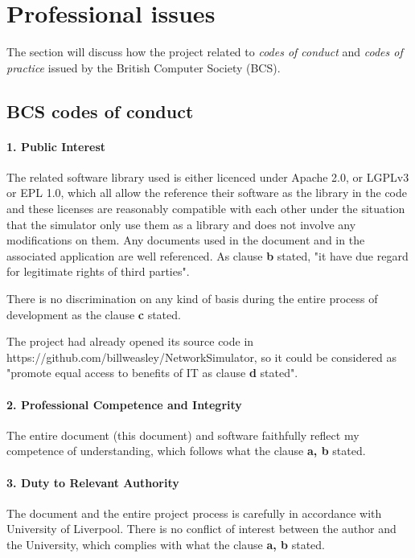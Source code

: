 \section{Professional issues}
The section will discuss how the project related to \textit{codes of conduct} \cite{bcsconduct} and \textit{codes of practice} \cite{bcspractic} issued by the British Computer Society (BCS).

\subsection{BCS codes of conduct \cite{bcsconduct}}
\paragraph{1. Public Interest}
The related software library \cite{Kotlin,Koma,GraphStream,JUnit} used is either licenced under Apache 2.0, or LGPLv3 or EPL 1.0, which all allow the
reference their software as the library in the code and these licenses are reasonably compatible with each other under the situation that the simulator only use them as a library and does not involve any modifications on them.
Any documents used in the document and in the associated application are well referenced. As clause \textbf{b} stated, "it have due regard for legitimate rights of third parties"\cite{bcsconduct}.

\par\noindent
There is no discrimination on any kind of basis during the entire process of development as the clause \textbf{c} stated.

\par\noindent
 The project had already opened its source code in https://github.com/billweasley/NetworkSimulator, so it could be considered as "promote equal access
 to benefits of IT as clause \textbf{d} stated".

\paragraph{2. Professional Competence and Integrity}
The entire document (this document) and software faithfully reflect my competence of understanding, which
follows what the clause \textbf{a, b} stated.

\paragraph{3. Duty to Relevant Authority}
The document and the entire project process is carefully in accordance with University of
Liverpool. There is no conflict of interest between the author and the University, which complies
with what the clause \textbf{a, b} stated.


